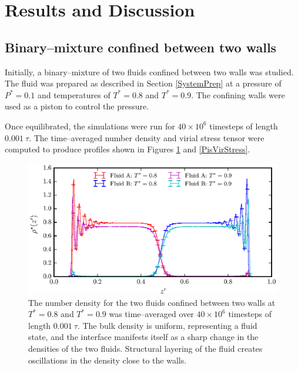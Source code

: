 \section{Results and Discussion}
\subsection{Binary--mixture confined between two walls}\label{Piston}
Initially, a binary--mixture of two fluids confined between two walls was studied. 
The fluid was prepared as described in Section \ref{SystemPrep} at a pressure of $P^{*} = 0.1$ and temperatures of $T^{*} = 0.8$ and $T^{*} = 0.9$.
The confining walls were used as a piston to control the pressure.

Once equilibrated, the simulations were run for $40 \times 10^{6}$ timesteps of length $0.001\ \tau$.
The time--averaged number density and virial stress tensor were computed to produce profiles shown in Figures \ref{PisVirRho} and \ref{PisVirStress}. 

\FloatBarrier
\begin{figure}[h!]
\centering
\includegraphics[scale=1.0]{PisVirRho}
\caption{The number density for the two fluids confined between two walls at $T^{*} = 0.8$ and $T^{*} = 0.9$ was time--averaged over $40 \times 10^{6}$ timesteps of length $0.001\ \tau$. 
The bulk density is uniform, representing a fluid state, and the interface manifests itself as a sharp change in the densities of the two fluids.
Structural layering of the fluid creates oscillations in the density close to the walls.
}
\label{PisVirRho}
\end{figure}


